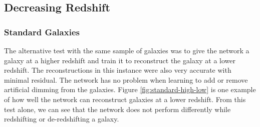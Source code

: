 \documentclass[fleqn,usenatbib]{mnras}
\begin{document}
\subsection{Decreasing Redshift} \label{sec:decreasing-redshift}
\subsubsection{Standard Galaxies} \label{sec:standard-test2}
The alternative test with the same sample of galaxies was to give the network a galaxy at a higher redshift and train it to reconstruct the galaxy at a lower redshift. The reconstructions in this instance were also very accurate with minimal residual. The network has no problem when learning to add or remove artificial dimming from the galaxies. Figure \ref{fig:standard-high-low} is one example of how well the network can reconstruct galaxies at a lower redshift. From this test alone, we can see that the network does not perform differently while redshifting or de-redshifting a galaxy.
\end{document}
